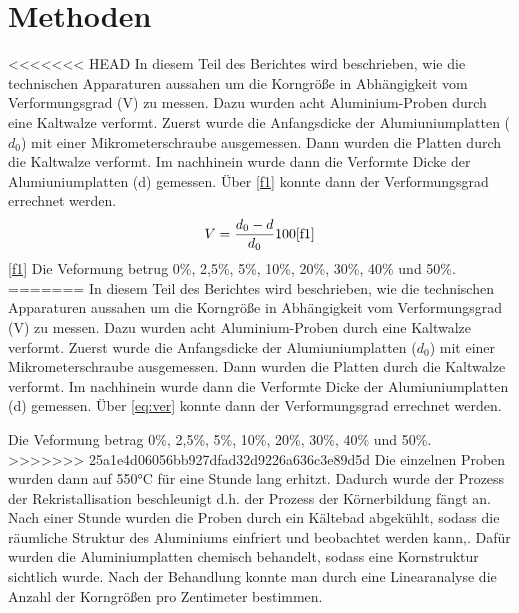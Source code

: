 \documentclass[
	a4paper,
	12pt,
	pagesize,
	ngerman
]{scrartcl}
\begin{document}
\section{Methoden}
<<<<<<< HEAD
In diesem Teil des Berichtes wird beschrieben, wie die technischen Apparaturen aussahen um die Korngröße in Abhängigkeit vom Verformungsgrad (V) zu messen. Dazu wurden acht Aluminium-Proben durch eine Kaltwalze verformt. Zuerst wurde die Anfangsdicke der Alumiuniumplatten ($d_0$) mit einer Mikrometerschraube ausgemessen. Dann wurden die Platten durch die Kaltwalze verformt. Im nachhinein wurde dann die Verformte Dicke der Alumiuniumplatten (d) gemessen. Über \cref{f1} konnte dann der Verformungsgrad errechnet werden.
\begin{align}
    V = \frac{d_0-d}{d_0}100 \cref{f1}
\end{align} \cref{f1}
Die Veformung betrug 0\%, 2,5\%, 5\%, 10\%, 20\%, 30\%, 40\% und 50\%.
=======
In diesem Teil des Berichtes wird beschrieben, wie die technischen Apparaturen aussahen um die Korngröße in Abhängigkeit vom Verformungsgrad (V) zu messen. Dazu wurden acht Aluminium-Proben durch eine Kaltwalze verformt. Zuerst wurde die Anfangsdicke der Alumiuniumplatten ($d_0$) mit einer Mikrometerschraube ausgemessen. Dann wurden die Platten durch die Kaltwalze verformt. Im nachhinein wurde dann die Verformte Dicke der Alumiuniumplatten (d) gemessen. Über \cref{eq:ver} konnte dann der Verformungsgrad errechnet werden.

Die Veformung betrag 0\%, 2,5\%, 5\%, 10\%, 20\%, 30\%, 40\% und 50\%.
>>>>>>> 25a1e4d06056bb927dfad32d9226a636c3e89d5d
Die einzelnen Proben wurden dann auf 550°C für eine Stunde lang erhitzt. Dadurch wurde der Prozess der Rekristallisation beschleunigt d.h. der Prozess der Körnerbildung fängt an. Nach einer Stunde wurden die Proben durch ein Kältebad abgekühlt, sodass die räumliche Struktur des Aluminiums einfriert und beobachtet werden kann,. Dafür wurden die Aluminiumplatten chemisch behandelt, sodass eine Kornstruktur sichtlich wurde. Nach der Behandlung konnte man durch eine Linearanalyse die Anzahl der Korngrößen pro Zentimeter bestimmen.
\end{document}
